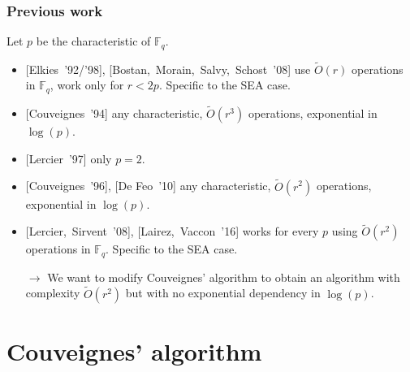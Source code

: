 \documentclass[10pt,a4paper]{beamer}
\theoremstyle{plain}
\theoremstyle{definition}
\theoremstyle{definition}
\theoremstyle{definition}
\theoremstyle{definition}
\theoremstyle{remark}
\theoremstyle{remark}
\begin{document}

\begin{frame}
\frametitle{Previous work}

Let $p$ be the characteristic of $\mathbb{F}_q$.

\begin{itemize}
\item{} [Elkies~'92/'98],  %
[Bostan,~Morain,~Salvy,~Schost~'08] use $\tilde{O}(r)$ operations in $\mathbb{F}_q$, work only for $r < 2p$. Specific to the SEA case.
\item{} [Couveignes~'94] any characteristic, $\tilde{O}(r^3)$ operations, exponential in $\log(p)$.
\item{} [Lercier~'97] only $p=2$.
\item{} [Couveignes~'96], [De Feo~'10] any characteristic, $\tilde{O}(r^2)$ operations, exponential in $\log(p)$.
\item{} [Lercier,~Sirvent~'08], [Lairez,~Vaccon~'16] works for every $p$ using $\tilde{O}(r^2)$ operations in $\mathbb{F}_q$. Specific to the SEA case.
\end{itemize}
\begin{itemize}


\item[$\rightarrow$] We want to modify Couveignes' algorithm to obtain an algorithm with complexity $\tilde{O}(r^2)$ but with no exponential dependency in $\log(p)$.

\end{itemize}
\end{frame}


\section{Couveignes' algorithm}
\end{document}

